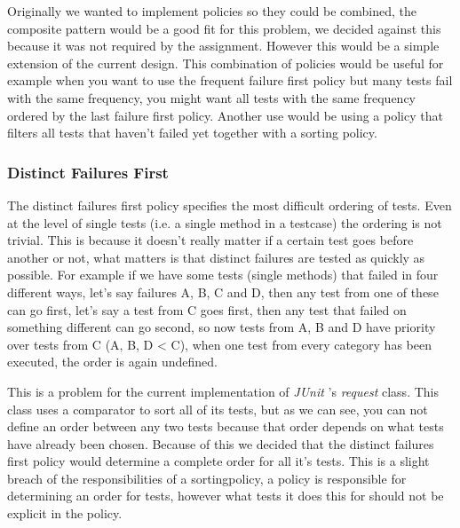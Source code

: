 \documentclass[i2]{oss}
\newcommand{\class}[1]{\emph{#1}}
\newcommand{\junit}{\emph{JUnit }}
\begin{document}
Originally we wanted to implement policies so they could be combined,
the composite pattern would be a good fit for this problem,
we decided against this because it was not required by the assignment.
However this would be a simple extension of the current design.
This combination of policies would be useful for example when you want
to use the frequent failure first policy but many tests fail with the
same frequency, you might want all tests with the same frequency ordered
by the last failure first policy.
Another use would be using a policy that filters all tests that haven't
failed yet together with a sorting policy.

\subsubsection{Distinct Failures First}

The distinct failures first policy specifies the most difficult 
ordering of tests.
Even at the level of single tests (i.e. a single method in a testcase)
the ordering is not trivial.
This is because it doesn't really matter if a certain test goes before 
another or not, what matters is that distinct failures are tested as 
quickly as possible.
For example if we have some tests (single methods) that failed in four
different ways, let's say failures A, B, C and D, then any test from 
one of these can go first, let's say a test from C goes first, then 
any test that failed on something different can go second, so now 
tests from A, B and D have priority over tests from C (A, B, D < C), 
when one test from every category has been executed, the order is again 
undefined.



This is a problem for the current implementation of \junit's 
\class{request} class.
This class uses a comparator to sort all of its tests, but as we can 
see, you can not define an order between any two tests because that 
order depends on what tests have already been chosen.
Because of this we decided that the distinct failures first policy would
determine a complete order for all it's tests.
This is a slight breach of the responsibilities of a sortingpolicy,
a policy is responsible for determining an order for tests,
however what tests it does this for should not be explicit in the 
policy.
\end{document}
